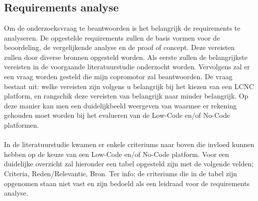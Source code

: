 
\chapter{}%
\label{ch:methodologie}


\section*{Requirements analyse}
\label{sec:requirements-analyse}
Om de onderzoeksvraag te beantwoorden is het belangrijk 
de requirements te analyseren. De opgestelde requirements zullen de basis vormen voor de beoordeling, de vergelijkende analyse en de proof of concept.
 Deze vereisten zullen door diverse bronnen opgesteld worden. Als eerste
  zullen de belangrijkste vereisten in de voorgaande literatuurstudie onderzocht worden. Vervolgens zal er een vraag
   worden gesteld die mijn copromotor zal beantwoorden. De vraag bestaat uit: welke vereisten zijn volgens u belangrijk bij het kiezen van een 
   LCNC platform, en rangschik deze vereisten van belangrijk naar minder belangrijk. Op deze manier kan men een duidelijkbeeld weergeven van waarmee er rekening gehouden moet worden bij het evalueren van de Low-Code en/of No-Code platformen.
\\
\\
In de literatuurstudie kwamen er enkele criteriums naar boven die invloed kunnen hebben op 
de keuze van een Low-Code en/of No-Code platform. Voor een duidelijke overzicht zal hieronder een tabel opgesteld zijn met de volgende velden; 
Criteria, Reden/Relevantie, Bron. Ter info; de criteriums die in de tabel zijn opgenomen 
staan niet vast en zijn bedoeld als een leidraad voor de requirements analyse.
\\
\\


